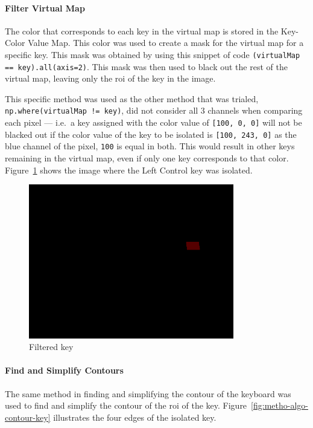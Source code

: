 \documentclass{report}
\begin{document}
\paragraph{Filter Virtual Map}
The color that corresponds to each key in the virtual map is stored in the
Key-Color Value Map. This color was used to create a mask for the virtual map
for a specific key. This mask was obtained by using this snippet of code
\texttt{(virtualMap == key).all(axis=2)}. This mask was then used to black out
the rest of the virtual map, leaving only the \ac{roi} of the key in the image.

This specific method was used as the other method that was trialed,
\texttt{np.where(virtualMap != key)}, did not consider all 3 channels when
comparing each pixel --- i.e.\ a key assigned with the color value of
\texttt{[100, 0, 0]} will not be blacked out if the color value of the key to be
isolated is \texttt{[100, 243, 0]} as the blue channel of the pixel,
\texttt{100} is equal in both. This would result in other keys remaining in the
virtual map, even if only one key corresponds to that color.
Figure~\ref{fig:metho-algo-filtered} shows the image where the Left Control key
was isolated.

\begin{figure}[H]
	\centering
	\includegraphics[width=0.8\textwidth]{filtered-key.png}
	\caption{Filtered key}
	\label{fig:metho-algo-filtered}
	\centering
\end{figure}

\paragraph{Find and Simplify Contours}
The same method in finding and simplifying the contour of the keyboard was used
to find and simplify the contour of the \ac{roi} of the key.
Figure~\ref{fig:metho-algo-contour-key} illustrates the four edges of the
isolated key.
\end{document}
